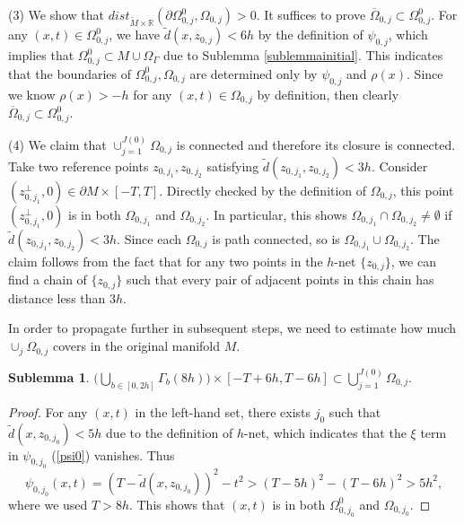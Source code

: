 \documentclass[11pt,letterpaper]{amsart}
\numberwithin{equation}{section}
\theoremstyle{definition}
\theoremstyle{plain}
\theoremstyle{definition}
\theoremstyle{plain}
\newtheorem{sublemmainitial2}[sublemmainitial]{Sublemma}
\theoremstyle{definition}
\theoremstyle{plain}
\begin{document}
\noindent (3) We show that $dist_{\widetilde{M}\times \mathbb{R}}(\partial \Omega^0_{0,j},\Omega_{0,j})>0$. It suffices to prove $\overline{\Omega}_{0,j}\subset \Omega^0_{0,j}$. For any $(x,t)\in \Omega^0_{0,j}$, we have $\widetilde{d}(x,z_{0,j})< 6h$ by the definition of $\psi_{0,j}$, which implies that $\Omega^0_{0,j}\subset M\cup \Omega_{\Gamma}$ due to Sublemma \ref{sublemmainitial}. 
This indicates that the boundaries of $\Omega_{0,j}^0,\Omega_{0,j}$ are determined only by $\psi_{0,j}$ and $\rho(x)$. Since we know $\rho(x)>-h$ for any $(x,t)\in \Omega_{0,j}$ by definition, then clearly $\overline{\Omega}_{0,j}\subset \Omega^0_{0,j}$.

\noindent (4) We claim that $\cup_{j=1}^{J(0)} \Omega_{0,j}$ is connected and therefore its closure is connected. Take two reference points $z_{0,j_1},z_{0,j_2}$ satisfying $\widetilde{d}(z_{0,j_1},z_{0,j_2})<3h$. Consider $(z_{0,j_1}^{\perp},0)\in \partial M\times [-T,T]$. Directly checked by the definition of $\Omega_{0,j}$, this point $(z_{0,j_1}^{\perp},0)$ is in both $\Omega_{0,j_1}$ and $\Omega_{0,j_2}$. 
In particular, this shows $\Omega_{0,j_1}\cap\Omega_{0,j_2}\neq\emptyset$ if $\widetilde{d}(z_{0,j_1},z_{0,j_2})<3h$. Since each $\Omega_{0,j}$ is path connected, so is $\Omega_{0,j_1}\cup\Omega_{0,j_2}$. The claim follows from the fact that for any two points in the $h$-net $\{z_{0,j}\}$, we can find a chain of $\{z_{0,j}\}$ such that every pair of adjacent points in this chain has distance less than $3h$. 

\medskip
In order to propagate further in subsequent steps, we need to estimate how much $\cup_{j} \Omega_{0,j}$ covers in the original manifold $M$.
\begin{sublemmainitial2}\label{sublemmainitial2}
$\big(\bigcup_{b\in [0,2h]}\Gamma_b(8h)\big)\times [-T+6h,T-6h] \subset \bigcup_{j=1}^{J(0)} \Omega_{0,j}.$
\end{sublemmainitial2}
\begin{proof}
For any $(x,t)$ in the left-hand set, there exists $j_0$ such that $\widetilde{d}(x,z_{0,j_0})< 5h$ due to the definition of $h$-net, which indicates that the $\xi$ term in $\psi_{0,j_0}$ (\ref{psi0}) vanishes. Thus
$$\psi_{0,j_0}(x,t)=(T-\widetilde{d}(x,z_{0,j_0}))^2-t^2 > (T-5h)^2-(T-6h)^2>5h^2,$$
where we used $T>8h$. This shows that $(x,t)$ is in both $\Omega^0_{0,j_0}$ and $\Omega_{0,j_0}$.
\end{proof}
\end{document}
